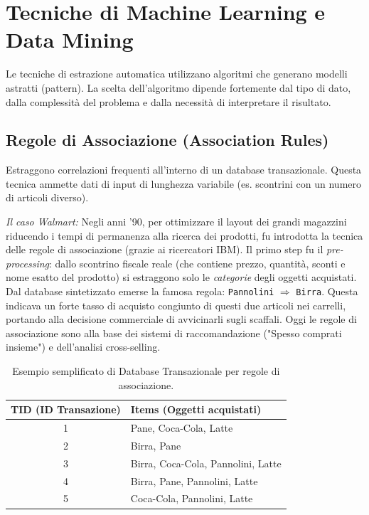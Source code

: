 \section{Tecniche di Machine Learning e Data Mining}
Le tecniche di estrazione automatica utilizzano algoritmi che generano modelli astratti (pattern). La scelta dell'algoritmo dipende fortemente dal tipo di dato, dalla complessità del problema e dalla necessità di interpretare il risultato.

\subsection{Regole di Associazione (Association Rules)}
Estraggono correlazioni frequenti all'interno di un database transazionale. Questa tecnica ammette dati di input di lunghezza variabile (es. scontrini con un numero di articoli diverso).

\textit{Il caso Walmart:} Negli anni '90, per ottimizzare il layout dei grandi magazzini riducendo i tempi di permanenza alla ricerca dei prodotti, fu introdotta la tecnica delle regole di associazione (grazie ai ricercatori IBM). Il primo step fu il \textit{pre-processing}: dallo scontrino fiscale reale (che contiene prezzo, quantità, sconti e nome esatto del prodotto) si estraggono solo le \textit{categorie} degli oggetti acquistati.
Dal database sintetizzato emerse la famosa regola: \texttt{Pannolini} $\Rightarrow$ \texttt{Birra}. Questa indicava un forte tasso di acquisto congiunto di questi due articoli nei carrelli, portando alla decisione commerciale di avvicinarli sugli scaffali. Oggi le regole di associazione sono alla base dei sistemi di raccomandazione ("Spesso comprati insieme") e dell'analisi cross-selling.

\begin{table}[H]
    \centering
    \begin{tabular}{|c|l|}
        \hline
        \textbf{TID (ID Transazione)} & \textbf{Items (Oggetti acquistati)} \\
        \hline
        1 & Pane, Coca-Cola, Latte \\
        2 & Birra, Pane \\
        3 & Birra, Coca-Cola, Pannolini, Latte \\
        4 & Birra, Pane, Pannolini, Latte \\
        5 & Coca-Cola, Pannolini, Latte \\
        \hline
    \end{tabular}
    \caption{Esempio semplificato di Database Transazionale per regole di associazione.}
    \label{tab:assoc-rules}
\end{table}

